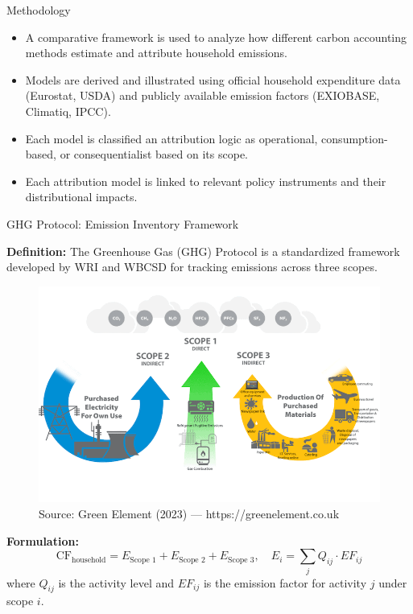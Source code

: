 \documentclass{beamer}
\begin{document}
\begin{frame}{Methodology}
\footnotesize
\begin{itemize}
\item A comparative framework is used to analyze how different carbon accounting methods estimate and attribute household emissions.
\item Models are derived and illustrated using official household expenditure data (Eurostat, USDA) and publicly available emission factors (EXIOBASE, Climatiq, IPCC).
\item Each model is classified an attribution logic as operational, consumption-based, or consequentialist based on its scope.
\item Each attribution model is linked to relevant policy instruments and their distributional impacts.
\end{itemize}
\end{frame}


\begin{frame}{GHG Protocol: Emission Inventory Framework}
\small
\vspace{-2.5em}

\footnotesize \textbf{Definition:}  
The Greenhouse Gas (GHG) Protocol is a standardized framework developed by WRI and WBCSD for tracking emissions across three scopes.
\vspace{-0.5em}
\begin{figure}[h]
  \centering
  \includegraphics[width=0.55\linewidth]{ghg scope.png}
  \caption*{\tiny Source: Green Element (2023) — https://greenelement.co.uk}
\end{figure}
\vspace{-1.0em}
\footnotesize \textbf{Formulation:}
\[
\text{CF}_{\text{household}} = E_{\text{Scope 1}} + E_{\text{Scope 2}} + E_{\text{Scope 3}}, \quad 
E_i = \sum_j Q_{ij} \cdot EF_{ij}
\]
{\footnotesize where $Q_{ij}$ is the activity level and $EF_{ij}$ is the emission factor for activity $j$ under scope $i$.}

\end{frame}
\end{document}
